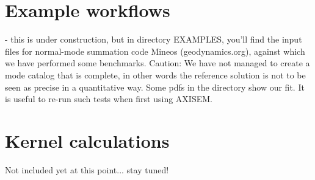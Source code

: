 \documentclass[11pt,letter,fleqn,english,notitlepage]{article}
\begin{document}
\section{Example workflows}
- this is under construction, but in directory EXAMPLES, you'll find
the input files for normal-mode summation code Mineos
(geodynamics.org), against which we have performed some
benchmarks. Caution: We have not managed to create a mode catalog that
is complete, in other words the reference solution is not to be seen
as precise in a quantitative way. Some pdfs in the directory show our
fit. It is useful to re-run such tests when first using AXISEM.

\section{Kernel calculations}
Not included yet at this point... stay tuned!\\


\end{document}
